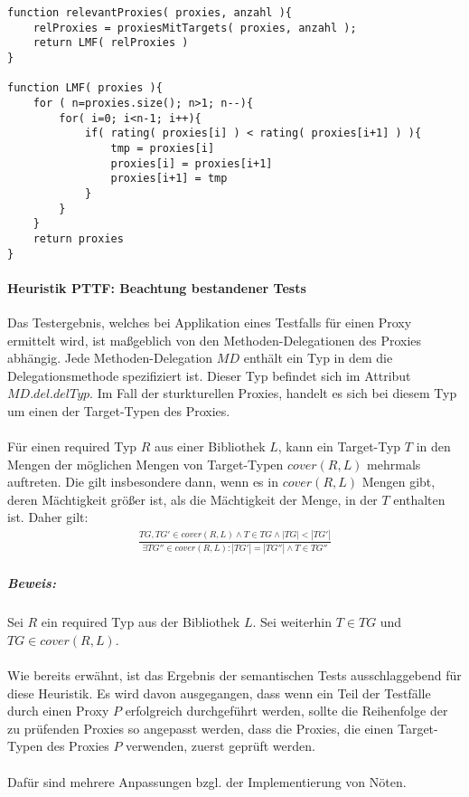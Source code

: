 \documentclass[a4paper,12pt]{article}
\begin{document}
\begin{lstlisting}[style = pseudo]
function relevantProxies( proxies, anzahl ){
	relProxies = proxiesMitTargets( proxies, anzahl );
	return LMF( relProxies )
}

function LMF( proxies ){
	for	( n=proxies.size(); n>1; n--){
		for( i=0; i<n-1; i++){
			if( rating( proxies[i] ) < rating( proxies[i+1] ) ){
				tmp = proxies[i]
				proxies[i] = proxies[i+1]
				proxies[i+1] = tmp
			}
		}
	}	
	return proxies
}
\end{lstlisting}


\paragraph{Heuristik PTTF: Beachtung bestandener Tests}
\noindent
\newline
Das Testergebnis, welches bei Applikation eines Testfalls für einen Proxy ermittelt wird, ist maßgeblich von den Methoden-Delegationen des Proxies abhängig. Jede Methoden-Delegation $\mathit{MD}$ enthält ein Typ in dem die Delegationsmethode spezifiziert ist. Dieser Typ befindet sich im Attribut $\mathit{MD.del.delTyp}$. Im Fall der sturkturellen Proxies, handelt es sich bei diesem Typ um einen der Target-Typen des Proxies.\\\\
Für einen required Typ $R$ aus einer Bibliothek $L$, kann ein Target-Typ $T$ in den Mengen der möglichen Mengen von Target-Typen $\mathit{cover(R,L)}$ mehrmals auftreten. Die gilt insbesondere dann, wenn es in $\mathit{cover(R,L)}$ Mengen gibt, deren Mächtigkeit größer ist, als die Mächtigkeit der Menge, in der $T$ enthalten ist. Daher gilt:
\begin{gather*}
\frac{\mathit{TG},\mathit{TG'} \in \mathit{cover(R,L)} \wedge T \in \mathit{TG} \wedge |\mathit{TG}| < |\mathit{TG'}|}{\exists \mathit{TG''} \in \mathit{cover(R,L)} : |\mathit{TG'}| = |\mathit{TG''}| \wedge T \in \mathit{TG''}}
\end{gather*}
\noindent
\subparagraph{Beweis:}
Sei $R$ ein required Typ aus der Bibliothek $L$. Sei weiterhin $T \in \mathit{TG}$ und $\mathit{TG} \in \mathit{cover(R,L)}$.
\\\\
Wie bereits erwähnt, ist das Ergebnis der semantischen Tests ausschlaggebend für diese Heuristik. Es wird davon ausgegangen, dass wenn ein Teil der Testfälle durch einen Proxy $P$ erfolgreich durchgeführt werden, sollte die Reihenfolge der zu prüfenden Proxies so angepasst werden, dass die Proxies, die einen Target-Typen des Proxies $P$ verwenden, zuerst geprüft werden.\\\\
Dafür sind mehrere Anpassungen bzgl. der Implementierung von Nöten. 
\end{document}
